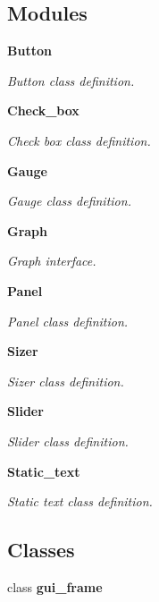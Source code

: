 \subsection*{Modules}
\begin{DoxyCompactItemize}
\item 
\textbf{ Button}
\begin{DoxyCompactList}\small\item\em Button class definition. \end{DoxyCompactList}\item 
\textbf{ Check\+\_\+box}
\begin{DoxyCompactList}\small\item\em Check box class definition. \end{DoxyCompactList}\item 
\textbf{ Gauge}
\begin{DoxyCompactList}\small\item\em Gauge class definition. \end{DoxyCompactList}\item 
\textbf{ Graph}
\begin{DoxyCompactList}\small\item\em Graph interface. \end{DoxyCompactList}\item 
\textbf{ Panel}
\begin{DoxyCompactList}\small\item\em Panel class definition. \end{DoxyCompactList}\item 
\textbf{ Sizer}
\begin{DoxyCompactList}\small\item\em Sizer class definition. \end{DoxyCompactList}\item 
\textbf{ Slider}
\begin{DoxyCompactList}\small\item\em Slider class definition. \end{DoxyCompactList}\item 
\textbf{ Static\+\_\+text}
\begin{DoxyCompactList}\small\item\em Static text class definition. \end{DoxyCompactList}\end{DoxyCompactItemize}
\subsection*{Classes}
\begin{DoxyCompactItemize}
\item 
class \textbf{ gui\+\_\+frame}
\end{DoxyCompactItemize}
